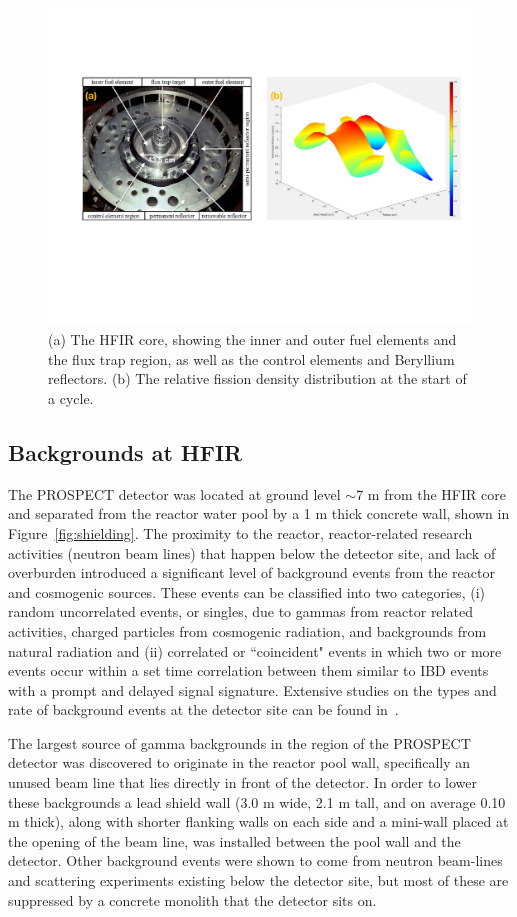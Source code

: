 \begin{figure}[t]
	\centering
	\includegraphics[width=0.9\linewidth]{tex/4-prospect-images/HFIR}
	\caption{(a) The HFIR core, showing the inner and outer fuel elements and the flux trap region, as well as the control elements and Beryllium reflectors. (b) The relative fission density distribution at the start of a cycle. \cite{HFIRTech}}
	\label{fig:hfir}
\end{figure}

\subsection{Backgrounds at HFIR}

The PROSPECT detector was located at ground level $\sim$7 m from the HFIR core and separated from the reactor water pool by a 1 m thick concrete wall, shown in Figure~\ref{fig:shielding}.
The proximity to the reactor, reactor-related research activities (neutron beam lines) that happen below the detector site, and lack of overburden introduced a significant level of background events from the reactor and cosmogenic sources. 
These events can be classified into two categories, (i) random uncorrelated events, or singles, due to gammas from reactor related activities, charged particles from cosmogenic radiation, and backgrounds from natural radiation and (ii) correlated or ``coincident" events in which two or more events occur within a set time correlation between them similar to IBD events with a prompt and delayed signal signature.
Extensive studies on the types and rate of background events at the detector site can be found in~\cite{Ashenfelter:2015tpm,Heffron,Hackett}.

The largest source of gamma backgrounds in the region of the PROSPECT detector was discovered to originate in the reactor pool wall, specifically an unused beam line that lies directly in front of the detector. 
In order to lower these backgrounds a lead shield wall (3.0 m wide, 2.1 m tall, and on average 0.10 m thick), along with shorter flanking walls on each side and a mini-wall placed at the opening of the beam line, was installed between the pool wall and the detector.
Other background events were shown to come from neutron beam-lines and scattering experiments existing below the detector site, but most of these are suppressed by a concrete monolith that the detector sits on.

